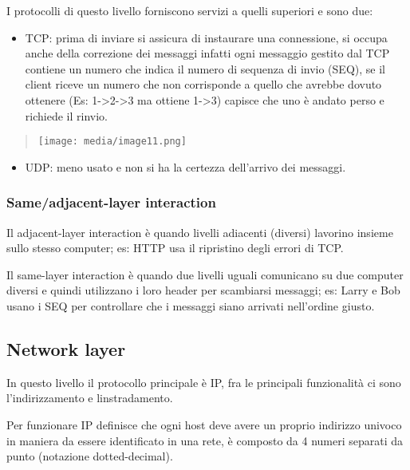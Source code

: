 I protocolli di questo livello forniscono servizi a quelli superiori e
sono due:

\begin{itemize}
\item
  TCP: prima di inviare si assicura di instaurare una connessione, si
  occupa anche della correzione dei messaggi infatti ogni messaggio
  gestito dal TCP contiene un numero che indica il numero di sequenza di
  invio (SEQ), se il client riceve un numero che non corrisponde a
  quello che avrebbe dovuto ottenere (Es: 1-\textgreater2-\textgreater3
  ma ottiene 1-\textgreater3) capisce che uno è andato perso e richiede
  il rinvio.
\end{itemize}

\begin{quote}
\texttt{[image: media/image11.png]}
\end{quote}

\begin{itemize}
\item
  UDP: meno usato e non si ha la certezza dell'arrivo dei messaggi.
\end{itemize}

\subsubsection{Same/adjacent-layer
interaction}\label{sameadjacent-layer-interaction}

Il adjacent-layer interaction è quando livelli adiacenti (diversi)
lavorino insieme sullo stesso computer; es: HTTP usa il ripristino degli
errori di TCP.

Il same-layer interaction è quando due livelli uguali comunicano su due
computer diversi e quindi utilizzano i loro header per scambiarsi
messaggi; es: Larry e Bob usano i SEQ per controllare che i messaggi
siano arrivati nell'ordine giusto.

\subsection{Network layer}\label{network-layer}

In questo livello il protocollo principale è IP, fra le principali
funzionalità ci sono l'indirizzamento e l\textquotesingle instradamento.

Per funzionare IP definisce che ogni host deve avere un proprio
indirizzo univoco in maniera da essere identificato in una rete, è
composto da 4 numeri separati da punto (notazione dotted-decimal).

